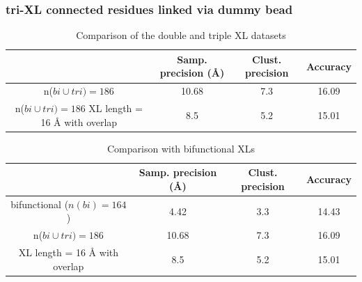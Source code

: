 \documentclass[a4paper,8pt]{beamer}
\begin{document}
%
\begin{frame}
\frametitle{tri-XL connected residues linked via dummy bead}
\begin{table}
  \centering
  \caption{Comparison of the double and triple XL datasets}
  \begin{tabular}{|c|c|c|c|}
      \hline
                                   & Samp. precision ({\AA}) & Clust. precision & Accuracy\\ \hline
      n($bi \cup tri) = 186$       & 10.68 & 7.3 &  16.09 \\\hline
      n($bi \cup tri) = 186$ XL length = 16 {\AA} with overlap & 8.5   & 5.2 & 15.01 \\\hline
  \end{tabular}
\end{table}
%
\begin{table}
  \centering
  \caption{Comparison with bifunctional XLs}
  \begin{tabular}{|c|c|c|c|}
      \hline
                                   & Samp. precision ({\AA}) & Clust. precision & Accuracy\\ \hline
      bifunctional ($n(bi) = 164$) & 4.42  & 3.3 & 14.43 \\\hline
      n($bi \cup tri) = 186$       & 10.68 & 7.3 &  16.09 \\\hline
      XL length = 16 {\AA} with overlap & 8.5   & 5.2 & 15.01 \\\hline
  \end{tabular}
\end{table}
\end{frame}
%
\end{document}
